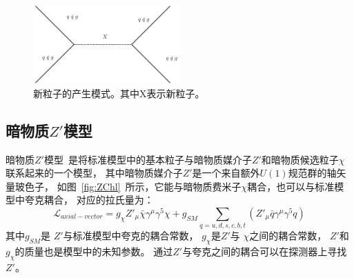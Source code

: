 \begin{figure}
  \begin{center}
    \includegraphics[width=0.5\textwidth]{figuresTHE/SChl.pdf}
  \end{center}
  \caption{
新粒子的产生模式。其中X表示新粒子。
}
    \label{fig:BSMDijet1}
\end{figure}






\subsection{暗物质$Z'$模型}
\label{sec:ZPrime}

暗物质$Z'$模型~\cite{DM1,DM2,DM3}是将标准模型中的基本粒子与暗物质媒介子$Z'$和暗物质候选粒子$\chi$联系起来的一个模型，
其中暗物质媒介子$Z'$是一个来自额外$U(1)$规范群的轴矢量玻色子，
如图~\ref{fig:ZChl}~所示，它能与暗物质费米子$\chi$耦合，也可以与标准模型中夸克耦合，
对应的拉氏量为：
\begin{equation} 
\label{eq:ZPrime1}
\mathcal{L}_{axial-vector}=g_{\chi} Z'_{\mu} \bar{\chi} \gamma^{\mu} \gamma^5 \chi +
g_{SM} \sum_{q=u,d,s,c,b,t} \left( Z'_{\mu} \bar{q} \gamma^{\mu} \gamma^5 q \right)
\end{equation}
其中$g_{SM}$是
$Z'$与标准模型中夸克的耦合常数，
$g_{\chi}$是$Z'$与
$\chi$之间的耦合常数，
$Z'$和$g_{\chi}$的质量也是模型中的未知参数。
通过$Z'$与夸克之间的耦合可以在探测器上寻找$Z'$。

